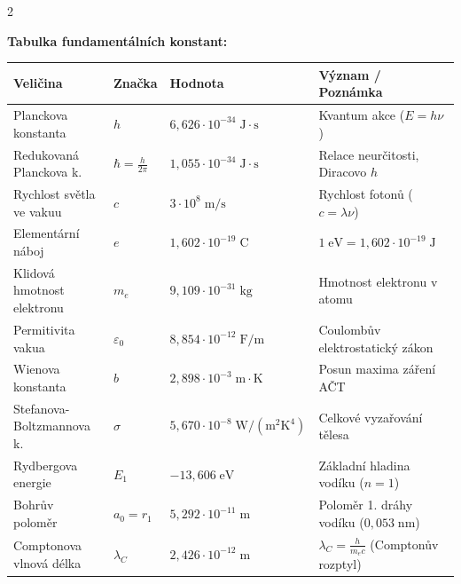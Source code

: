 \documentclass[9pt,a4paper]{article}
\begin{document}
\begin{tcolorbox}[secbox,title=1. FUNDAMENTÁLNÍ FYZIKÁLNÍ KONSTANTY A ZÁKLADNÍ KVANTOVÉ VZTAHY]
\begin{multicols}{2}

\textbf{Tabulka fundamentálních konstant:}
\vspace{1mm}

\begin{center}
\renewcommand{\arraystretch}{1.1}
\setlength{\tabcolsep}{3pt}
{\footnotesize
\begin{tabularx}{\linewidth}{l l l X}
\toprule
\textbf{Veličina} & \textbf{Značka} & \textbf{Hodnota} & \textbf{Význam / Poznámka} \\
\midrule
Planckova konstanta & $h$ & $6{,}626 \cdot 10^{-34}\;\text{J}\cdot\text{s}$ & Kvantum akce ($E = h\nu$) \\
Redukovaná Planckova k. & $\hbar = \frac{h}{2\pi}$ & $1{,}055 \cdot 10^{-34}\;\text{J}\cdot\text{s}$ & Relace neurčitosti, Diracovo $h$ \\
Rychlost světla ve vakuu & $c$ & $3 \cdot 10^8\;\text{m/s}$ & Rychlost fotonů ($c = \lambda\nu$) \\
Elementární náboj & $e$ & $1{,}602 \cdot 10^{-19}\;\text{C}$ & $1\;\text{eV} = 1{,}602 \cdot 10^{-19}\;\text{J}$ \\
Klidová hmotnost elektronu & $m_e$ & $9{,}109 \cdot 10^{-31}\;\text{kg}$ & Hmotnost elektronu v atomu \\
Permitivita vakua & $\varepsilon_0$ & $8{,}854 \cdot 10^{-12}\;\text{F/m}$ & Coulombův elektrostatický zákon \\
Wienova konstanta & $b$ & $2{,}898 \cdot 10^{-3}\;\text{m}\cdot\text{K}$ & Posun maxima záření AČT \\
Stefanova-Boltzmannova k. & $\sigma$ & $5{,}670 \cdot 10^{-8}\;\text{W}/(\text{m}^2\text{K}^4)$ & Celkové vyzařování tělesa \\
Rydbergova energie & $E_1$ & $-13{,}606\;\text{eV}$ & Základní hladina vodíku ($n=1$) \\
Bohrův poloměr & $a_0 = r_1$ & $5{,}292 \cdot 10^{-11}\;\text{m}$ & Poloměr 1. dráhy vodíku ($0{,}053\;\text{nm}$) \\
Comptonova vlnová délka & $\lambda_C$ & $2{,}426 \cdot 10^{-12}\;\text{m}$ & $\lambda_C = \frac{h}{m_e c}$ (Comptonův rozptyl) \\
\bottomrule
\end{tabularx}}
\end{center}

\columnbreak


\end{multicols}
\end{tcolorbox}
\end{document}
